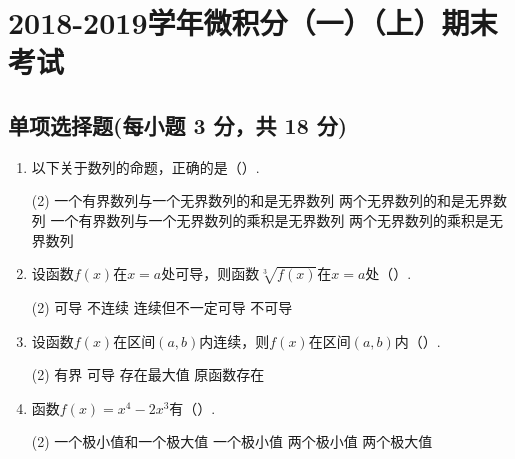 \documentclass[../Main.tex]{subfiles}
\begin{document}
\chapter{2018-2019学年微积分（一）（上）期末考试}

\section{单项选择题(每小题 3 分，共 18 分)}
\begin{enumerate}
    \item 以下关于数列的命题，正确的是（\qquad）.

          \begin{tasks}[label=\textbf{\Alph*.}, label-width=1.5em, column-sep=1em](2)
              \task 一个有界数列与一个无界数列的和是无界数列
              \task 两个无界数列的和是无界数列
              \task 一个有界数列与一个无界数列的乘积是无界数列
              \task 两个无界数列的乘积是无界数列
          \end{tasks}
          \vspace{1em}

    \item 设函数$f(x)$在$x=a$处可导，则函数$\sqrt[3]{f(x)}$在$x=a$处（\qquad）.

          \begin{tasks}[label=\textbf{\Alph*.}, label-width=1.5em, column-sep=1em](2)
              \task 可导
              \task 不连续
              \task 连续但不一定可导
              \task 不可导
          \end{tasks}
          \vspace{1em}

    \item 设函数$f(x)$在区间$(a,b)$内连续，则$f(x)$在区间$(a,b)$内（\qquad）.

          \begin{tasks}[label=\textbf{\Alph*.}, label-width=1.5em, column-sep=1em](2)
              \task 有界
              \task 可导
              \task 存在最大值
              \task 原函数存在
          \end{tasks}
          \vspace{1em}

    \item 函数$f(x)=x^{4}-2x^{3}$有（\qquad）.

          \begin{tasks}[label=\textbf{\Alph*.}, label-width=1.5em, column-sep=1em](2)
              \task 一个极小值和一个极大值
              \task 一个极小值
              \task 两个极小值
              \task 两个极大值
          \end{tasks}
          \vspace{1em}


\end{enumerate}
\end{document}
